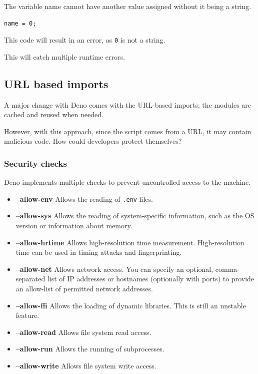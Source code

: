 \documentclass[12pt, letterpaper]{article}
\begin{document}
\begin{multicols}{2}
    The variable name cannot have another value assigned without it being a string.

    \begin{lstlisting}
name = 0;
    \end{lstlisting}

    This code will result in an error, as \verb|0| is not a string.

    This will catch multiple runtime errors.

    \subsection{URL based imports}

    A major change with Deno comes with the URL-based imports; the modules are cached and reused when needed.

    However, with this approach, since the script comes from a URL, it may contain malicious code. How could developers protect themselves?

    \subsubsection{Security checks}

    Deno implements multiple checks to prevent uncontrolled access to the machine. \cite{DenoSec}

    \begin{itemize}
        \item \textbf{--allow-env} Allows the reading of \verb|.env| files.
        \item \textbf{--allow-sys} Allows the reading of system-specific information, such as the OS version or information about memory.
        \item \textbf{--allow-hrtime} Allows high-resolution time measurement. High-resolution time can be used in timing attacks and fingerprinting.
        \item \textbf{--allow-net} Allows network access. You can specify an optional, comma-separated list of IP addresses or hostnames (optionally with ports) to provide an allow-list of permitted network addresses.
        \item \textbf{--allow-ffi} Allows the loading of dynamic libraries. This is still an unstable feature.
        \item \textbf{--allow-read} Allows file system read access.
        \item \textbf{--allow-run} Allows the running of subprocesses.
        \item \textbf{--allow-write} Allows file system write access.
    \end{itemize}


\end{multicols}
\end{document}
